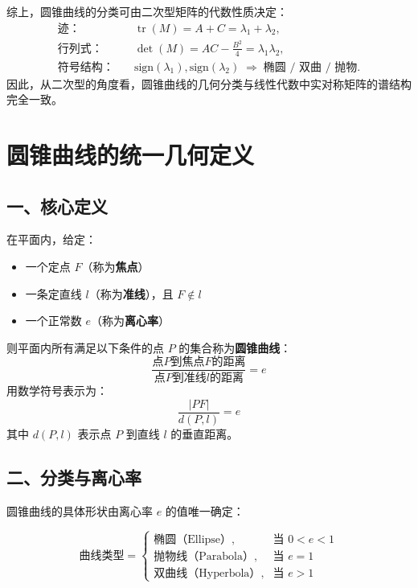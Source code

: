 \documentclass{article}
\begin{document}
综上，圆锥曲线的分类可由二次型矩阵的代数性质决定：
\[
\boxed{
	\begin{aligned}
		\text{迹：}&\quad \operatorname{tr}(M) = A + C = \lambda_1 + \lambda_2, \\
		\text{行列式：}&\quad \det(M) = AC - \tfrac{B^2}{4} = \lambda_1 \lambda_2, \\
		\text{符号结构：}&\quad \text{sign}(\lambda_1),\text{sign}(\lambda_2)
		\;\Rightarrow\;
		\text{椭圆 / 双曲 / 抛物}.
	\end{aligned}
}
\]
因此，从二次型的角度看，圆锥曲线的几何分类与线性代数中实对称矩阵的谱结构完全一致。


	\section*{圆锥曲线的统一几何定义}
	
	\subsection*{一、核心定义}
	
	在平面内，给定：
	\begin{itemize}
		\item 一个定点 \( F \)（称为\textbf{焦点}）
		\item 一条定直线 \( l \)（称为\textbf{准线}），且 \( F \notin l \)
		\item 一个正常数 \( e \)（称为\textbf{离心率}）
	\end{itemize}
	
	则平面内所有满足以下条件的点 \( P \) 的集合称为\textbf{圆锥曲线}：
	\[
	\frac{\text{点}P\text{到焦点}F\text{的距离}}{\text{点}P\text{到准线}l\text{的距离}} = e
	\]
	用数学符号表示为：
	\[
	\frac{|PF|}{d(P, l)} = e
	\]
	其中 \( d(P, l) \) 表示点 \( P \) 到直线 \( l \) 的垂直距离。
	
	\subsection*{二、分类与离心率}
	
	圆锥曲线的具体形状由离心率 \( e \) 的值唯一确定：
	
	\[
	\text{曲线类型} =
	\begin{cases}
		\text{椭圆（Ellipse）}, & \text{当 } 0 < e < 1 \\
		\text{抛物线（Parabola）}, & \text{当 } e = 1 \\
		\text{双曲线（Hyperbola）}, & \text{当 } e > 1
	\end{cases}
	\]
	
\end{document}
